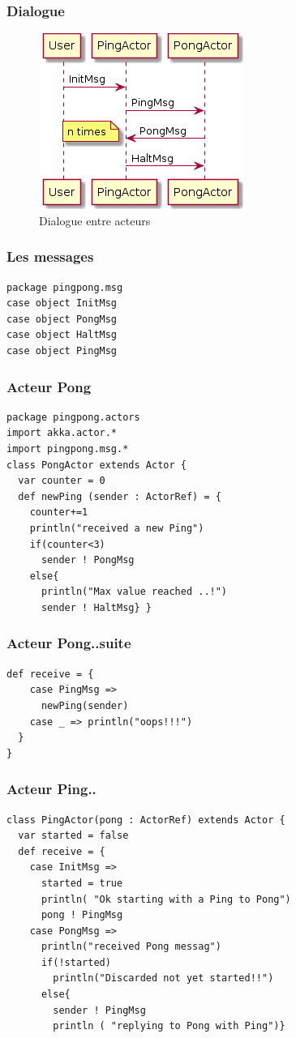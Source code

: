\documentclass[xcolor=dvipsnames]{beamer}
\begin{document}
\begin{frame}[fragile]
  \frametitle{Dialogue}
  \begin{figure}[h!]
  \caption{Dialogue entre acteurs}
  \centering
      \includegraphics[scale=0.5]{pingpong-sequence}
   \end{figure}
\end{frame}

\begin{frame}[fragile]
  \frametitle{Les messages}
    \lstset{frameround=fttt}
    \begin{lstlisting}[frame=trBL]
package pingpong.msg
case object InitMsg
case object PongMsg
case object HaltMsg
case object PingMsg
    \end{lstlisting}
\end{frame}

\begin{frame}[fragile]
  \frametitle{Acteur Pong}
  \lstset{frameround=fttt}
  \begin{lstlisting}[frame=trBL]
package pingpong.actors
import akka.actor.*
import pingpong.msg.*
class PongActor extends Actor {
  var counter = 0
  def newPing (sender : ActorRef) = {
    counter+=1
    println("received a new Ping")
    if(counter<3)
      sender ! PongMsg
    else{
      println("Max value reached ..!")
      sender ! HaltMsg} }
  \end{lstlisting}
\end{frame}


\begin{frame}[fragile]
  \frametitle{Acteur Pong..suite}
  \lstset{frameround=fttt}
  \begin{lstlisting}[frame=trBL]
  def receive = {
    case PingMsg =>
      newPing(sender)
    case _ => println("oops!!!")
  }
}
  \end{lstlisting}
\end{frame}


\begin{frame}[fragile]
  \frametitle{Acteur Ping..}
  \lstset{frameround=fttt}
  \begin{lstlisting}[frame=trBL]
class PingActor(pong : ActorRef) extends Actor {
  var started = false
  def receive = {
    case InitMsg =>
      started = true
      println( "Ok starting with a Ping to Pong")
      pong ! PingMsg
    case PongMsg =>
      println("received Pong messag")
      if(!started)
        println("Discarded not yet started!!")
      else{
        sender ! PingMsg
        println ( "replying to Pong with Ping")}
  \end{lstlisting}
\end{frame}
\end{document}
